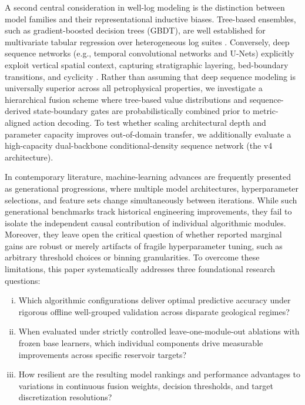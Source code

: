 \documentclass[preprint,12pt,nopreprintline]{elsarticle}
\begin{document}
A second central consideration in well-log modeling is the distinction between model families and their representational inductive biases. Tree-based ensembles, such as gradient-boosted decision trees (GBDT), are well established for multivariate tabular regression over heterogeneous log suites \cite{prokhorenkova2018catboost,ke2017lightgbm}. Conversely, deep sequence networks (e.g., temporal convolutional networks and U-Nets) explicitly exploit vertical spatial context, capturing stratigraphic layering, bed-boundary transitions, and cyclicity \cite{bai2018tcn,ronneberger2015unet}. Rather than assuming that deep sequence modeling is universally superior across all petrophysical properties, we investigate a hierarchical fusion scheme where tree-based value distributions and sequence-derived state-boundary gates are probabilistically combined prior to metric-aligned action decoding. To test whether scaling architectural depth and parameter capacity improves out-of-domain transfer, we additionally evaluate a high-capacity dual-backbone conditional-density sequence network (the v4 architecture).

In contemporary literature, machine-learning advances are frequently presented as generational progressions, where multiple model architectures, hyperparameter selections, and feature sets change simultaneously between iterations. While such generational benchmarks track historical engineering improvements, they fail to isolate the independent causal contribution of individual algorithmic modules. Moreover, they leave open the critical question of whether reported marginal gains are robust or merely artifacts of fragile hyperparameter tuning, such as arbitrary threshold choices or binning granularities. To overcome these limitations, this paper systematically addresses three foundational research questions:
\begin{enumerate}[(i)]
\item Which algorithmic configurations deliver optimal predictive accuracy under rigorous offline well-grouped validation across disparate geological regimes?
\item When evaluated under strictly controlled leave-one-module-out ablations with frozen base learners, which individual components drive measurable improvements across specific reservoir targets?
\item How resilient are the resulting model rankings and performance advantages to variations in continuous fusion weights, decision thresholds, and target discretization resolutions?
\end{enumerate}
\end{document}
